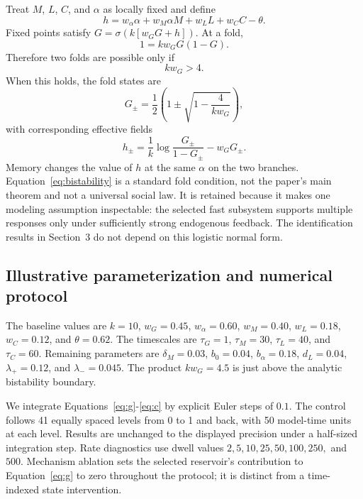\documentclass[10pt,a4paper]{article}
\begin{document}
Treat $M$, $L$, $C$, and $\alpha$ as locally fixed and define
\begin{equation}
h=w_\alpha\alpha+w_M\alpha M+w_LL+w_CC-\theta.
\end{equation}
Fixed points satisfy $G=\sigma(k[w_GG+h])$. At a fold,
\begin{equation}
1=k w_G G(1-G).
\end{equation}
Therefore two folds are possible only if
\begin{equation}
k w_G>4. \label{eq:bistability}
\end{equation}
When this holds, the fold states are
\begin{equation}
G_{\pm}=\frac{1}{2}\left(1\pm\sqrt{1-\frac{4}{k w_G}}\right),
\end{equation}
with corresponding effective fields
\begin{equation}
h_{\pm}=\frac{1}{k}\log\frac{G_{\pm}}{1-G_{\pm}}-w_GG_{\pm}.
\end{equation}
Memory changes the value of $h$ at the same $\alpha$ on the two branches. Equation~\eqref{eq:bistability} is a standard fold condition, not the paper's main theorem and not a universal social law. It is retained because it makes one modeling assumption inspectable: the selected fast subsystem supports multiple responses only under sufficiently strong endogenous feedback. The identification results in Section~3 do not depend on this logistic normal form.

\subsection{Illustrative parameterization and numerical protocol}

The baseline values are $k=10$, $w_G=0.45$, $w_\alpha=0.60$, $w_M=0.40$, $w_L=0.18$, $w_C=0.12$, and $\theta=0.62$. The timescales are $\tau_G=1$, $\tau_M=30$, $\tau_L=40$, and $\tau_C=60$. Remaining parameters are $\delta_M=0.03$, $b_0=0.04$, $b_\alpha=0.18$, $d_L=0.04$, $\lambda_+=0.12$, and $\lambda_-=0.045$. The product $k w_G=4.5$ is just above the analytic bistability boundary.

We integrate Equations~\eqref{eq:g}-\eqref{eq:c} by explicit Euler steps of $0.1$. The control follows 41 equally spaced levels from 0 to 1 and back, with 50 model-time units at each level. Results are unchanged to the displayed precision under a half-sized integration step. Rate diagnostics use dwell values $2,5,10,25,50,100,250,$ and $500$. Mechanism ablation sets the selected reservoir's contribution to Equation~\eqref{eq:g} to zero throughout the protocol; it is distinct from a time-indexed state intervention.
\end{document}
